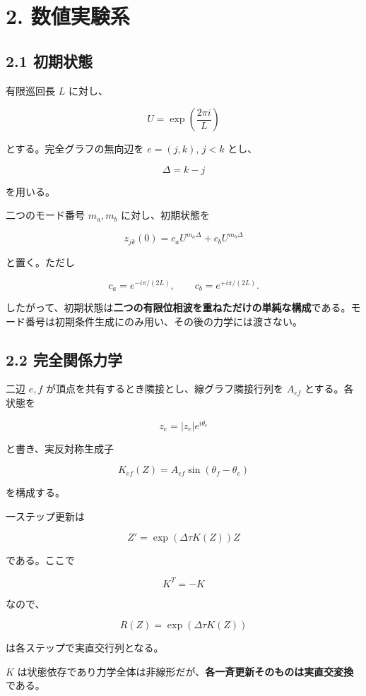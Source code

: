 \documentclass[
  a4paper,
]{ltjsarticle}
\begin{document}
\section{2. 数値実験系}\label{ux6570ux5024ux5b9fux9a13ux7cfb}

\subsection{2.1 初期状態}\label{ux521dux671fux72b6ux614b}

有限巡回長 \(L\) に対し、

\[
U=\exp\left(\frac{2\pi i}{L}\right)
\]

とする。完全グラフの無向辺を \(e=(j,k)\), \(j<k\) とし、

\[
\Delta=k-j
\]

を用いる。

二つのモード番号 \(m_a,m_b\) に対し、初期状態を

\[
z_{jk}(0)
=
c_a U^{m_a\Delta}
+
c_b U^{m_b\Delta}
\]

と置く。ただし

\[
c_a=e^{-i\pi/(2L)},
\qquad
c_b=e^{+i\pi/(2L)}.
\]

したがって、初期状態は\textbf{二つの有限位相波を重ねただけの単純な構成}である。モード番号は初期条件生成にのみ用い、その後の力学には渡さない。

\subsection{2.2
完全関係力学}\label{ux5b8cux5168ux95a2ux4fc2ux529bux5b66}

二辺 \(e,f\) が頂点を共有するとき隣接とし、線グラフ隣接行列を \(A_{ef}\)
とする。各状態を

\[
z_e=|z_e|e^{i\theta_e}
\]

と書き、実反対称生成子

\[
K_{ef}(Z)
=
A_{ef}\sin(\theta_f-\theta_e)
\]

を構成する。

一ステップ更新は

\[
\boxed{
Z'=\exp(\Delta\tau K(Z))Z
}
\]

である。ここで

\[
K^T=-K
\]

なので、

\[
R(Z)=\exp(\Delta\tau K(Z))
\]

は各ステップで実直交行列となる。

\(K\)
は状態依存であり力学全体は非線形だが、\textbf{各一斉更新そのものは実直交変換}である。
\end{document}
